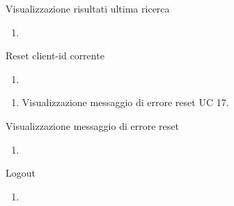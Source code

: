 \begin{usecase}{15}{Visualizzazione risultati ultima ricerca}\label{uc:}
    \usecasepre{}
    \usecasedesc{}
    \usecasepost{}

    \usecasemain{}
        \begin{enumerate}
            \item 
        \end{enumerate}

\end{usecase}

\begin{usecase}{16}{Reset client-id corrente}\label{uc:}
    \usecasepre{}
    \usecasedesc{}
    \usecasepost{}

    \usecasemain{}
        \begin{enumerate}
            \item 
        \end{enumerate}

    \usecaseext{}
        \begin{enumerate}
            \item Visualizzazione messaggio di errore reset UC 17.
        \end{enumerate}

\end{usecase}


\begin{usecase}{17}{Visualizzazione messaggio di errore reset}\label{uc:}
    \usecasepre{}
    \usecasedesc{}
    \usecasepost{}

    \usecasemain{}
        \begin{enumerate}
            \item 
        \end{enumerate}

\end{usecase}


\begin{usecase}{18}{Logout}\label{uc:}
    \usecasepre{}
    \usecasedesc{}
    \usecasepost{}

    \usecasemain{}
        \begin{enumerate}
            \item 
        \end{enumerate}

\end{usecase}


